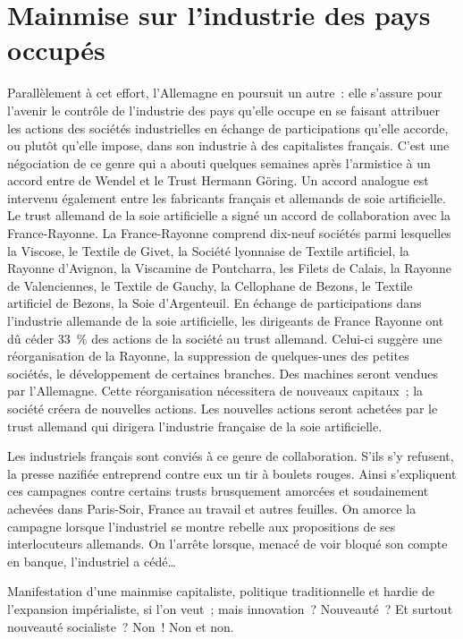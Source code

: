 \documentclass[french,twoside]{book} %
\begin{document}
\section[{Mainmise sur l’industrie des pays occupés}]{Mainmise sur l’industrie des pays occupés}
\noindent Parallèlement à cet effort, l’Allemagne en poursuit un autre : elle s’assure pour l’avenir le contrôle de l’industrie des pays qu’elle occupe en se faisant attribuer les actions des sociétés industrielles en échange de participations qu’elle accorde, ou plutôt qu’elle impose, dans son industrie à des capitalistes français. C’est une négociation de ce genre qui a abouti quelques semaines après l’armistice à un accord entre de Wendel et le Trust Hermann Göring. Un accord analogue est intervenu également entre les fabricants français et allemands de soie artificielle. Le trust allemand de la soie artificielle a signé un accord de collaboration avec la France-Rayonne. La France-Rayonne comprend dix-neuf sociétés parmi lesquelles la Viscose, le Textile de Givet, la Société lyonnaise de Textile artificiel, la Rayonne d’Avignon, la Viscamine de Pontcharra, les Filets de Calais, la Rayonne de Valenciennes, le Textile de Gauchy, la Cellophane de Bezons, le Textile artificiel de Bezons, la Soie d’Argenteuil. En échange de participations dans l’industrie allemande de la soie artificielle, les dirigeants de France Rayonne ont dû céder 33 \% des actions de la société au trust allemand. Celui-ci suggère une réorganisation de la Rayonne, la suppression de quelques-unes des petites sociétés, le développement de certaines branches. Des machines seront vendues par l’Allemagne. Cette réorganisation nécessitera de nouveaux capitaux ; la société créera de nouvelles actions. Les nouvelles actions seront achetées par le trust allemand qui dirigera l’industrie française de la soie artificielle.\par
Les industriels français sont conviés à ce genre de collaboration. S’ils s’y refusent, la presse nazifiée entreprend contre eux un tir à boulets rouges. Ainsi s’expliquent ces campagnes contre certains trusts brusquement amorcées et soudainement achevées dans Paris-Soir, France au travail et autres feuilles. On amorce la campagne lorsque l’industriel se montre rebelle aux propositions de ses interlocuteurs allemands. On l’arrête lorsque, menacé de voir bloqué son compte en banque, l’industriel a cédé…\par
Manifestation d’une mainmise capitaliste, politique traditionnelle et hardie de l’expansion impérialiste, si l’on veut ; mais innovation ? Nouveauté ? Et surtout nouveauté socialiste ? Non ! Non et non.
\end{document}
